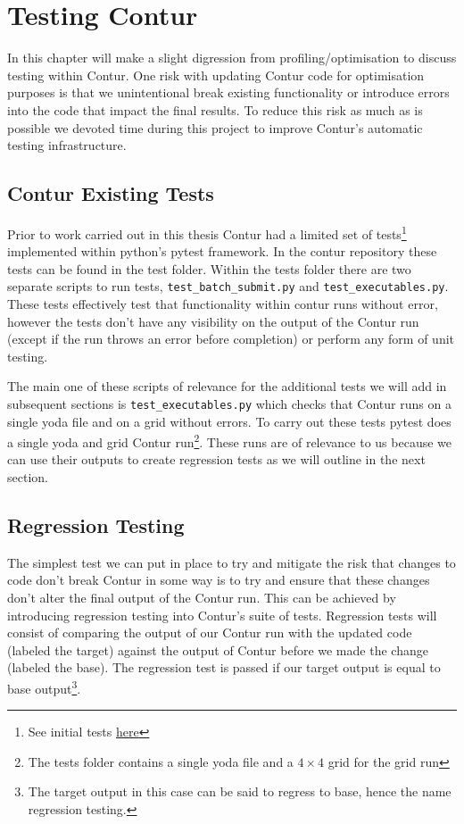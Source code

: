 \chapter{Testing Contur}
\label{chapterlabel4}
In this chapter will make a slight digression from profiling/optimisation to discuss testing within Contur. One risk with updating Contur code for optimisation purposes is that we unintentional break existing functionality or introduce errors into the code that impact the final results. To reduce this risk as much as is possible we devoted time during this project to improve Contur's automatic testing infrastructure.

\section{Contur Existing Tests}
Prior to work carried out in this thesis Contur had a limited set of tests\footnote{See initial tests \href{https://gitlab.com/hepcedar/contur/-/tree/49a67e039cf93c88b39dade3dfb7c5f03e780fb2/tests}{here}} implemented within python's pytest framework\cite{pytest}. In the contur repository these tests can be found in the test folder. Within the tests folder there are two separate scripts to run tests, \texttt{test\_batch\_submit.py} and \texttt{test\_executables.py}. These tests effectively test that functionality within contur runs without error, however the tests don't have any visibility on the output of the Contur run (except if the run throws an error before completion) or perform any form of unit testing. 

The main one of these scripts of relevance for the additional tests we will add in subsequent sections is \texttt{test\_executables.py} which checks that Contur runs on a single yoda file and on a grid without errors. To carry out these tests pytest does a single yoda and grid Contur run\footnote{The tests folder contains a single yoda file and a $4 \times 4$ grid for the grid run}. These runs are of relevance to us because we can use their outputs to create regression tests as we will outline in the next section.

\section{Regression Testing}
The simplest test we can put in place to try and mitigate the risk that changes to code don't break Contur in some way is to try and ensure that these changes don't alter the final output of the Contur run. This can be achieved by introducing regression testing into Contur's suite of tests. Regression tests will consist of comparing the output of our Contur run with the updated code (labeled the target) against the output of Contur before we made the change (labeled the base). The regression test is passed if our target output is equal to base output\footnote{The target output in this case can be said to regress to base, hence the name regression testing.}. 

